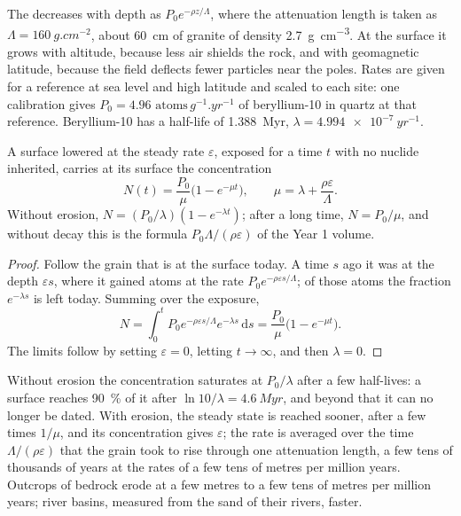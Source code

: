 The  decreases with depth as $P_0e^{-\rho z/\Lambda}$, where
the attenuation length is taken as $\Lambda = \qty{160}{g.cm^{-2}}$, about
\qty{60}{cm} of granite of density \qty{2.7}{g.cm^{-3}}. At the surface it
grows with altitude, because less air shields the rock, and with
geomagnetic latitude, because the field deflects fewer particles near the
poles. Rates are given for a reference at sea level and high latitude and
scaled to each site: one calibration gives $P_0 = \num{4.96}\text{ atoms}\,\unit{g^{-1}.yr^{-1}}$
of beryllium-10 in quartz at that reference. Beryllium-10 has a half-life of
\qty{1.388}{Myr}, $\lambda = \qty{4.994e-7}{yr^{-1}}$.

\begin{theorem}\label{thm:b3:advanced-geochronology:exposure}
A surface lowered at the steady rate $\varepsilon$, exposed for a time $t$
with no nuclide inherited, carries at its surface the concentration
\[
N(t) = \frac{P_0}{\mu}\bigl(1 - e^{-\mu t}\bigr), \qquad
\mu = \lambda + \frac{\rho\varepsilon}{\Lambda}.
\]
Without erosion, $N = (P_0/\lambda)(1 - e^{-\lambda t})$; after a long time,
$N = P_0/\mu$, and without decay this is the formula $P_0\Lambda/(\rho\varepsilon)$
of the Year 1 volume.
\end{theorem}

\begin{proof}
Follow the grain that is at the surface today. A time $s$ ago it was at the
depth $\varepsilon s$, where it gained atoms at the rate $P_0e^{-\rho\varepsilon
s/\Lambda}$; of those atoms the fraction $e^{-\lambda s}$ is left today. Summing
over the exposure,
\[
N = \int_0^t P_0e^{-\rho\varepsilon s/\Lambda}e^{-\lambda s}\,\mathrm ds
= \frac{P_0}{\mu}\bigl(1 - e^{-\mu t}\bigr).
\]
The limits follow by setting $\varepsilon = 0$, letting $t \to \infty$, and
then $\lambda = 0$.
\end{proof}

Without erosion the concentration saturates at $P_0/\lambda$ after a few
half-lives: a surface reaches \qty{90}{\percent} of it after $\ln 10/\lambda
= \qty{4.6}{Myr}$, and beyond that it can no longer be dated. With erosion,
the steady state is reached sooner, after a few times $1/\mu$, and its
concentration gives $\varepsilon$; the rate is averaged over the time
$\Lambda/(\rho\varepsilon)$ that the grain took to rise through one
attenuation length, a few tens of thousands of years at the rates of a few
tens of metres per million years. Outcrops of bedrock erode at a few metres
to a few tens of metres per million years; river basins, measured from the
sand of their rivers, faster.

